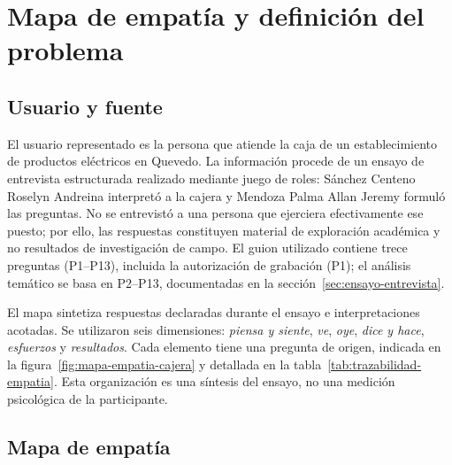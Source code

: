 \section{Mapa de empatía y definición del problema}
\label{sec:mapa-empatia}

\subsection{Usuario y fuente}

El usuario representado es la persona que atiende la caja de un establecimiento de productos eléctricos en Quevedo. La información procede de un ensayo de entrevista estructurada realizado mediante juego de roles: Sánchez Centeno Roselyn Andreina interpretó a la cajera y Mendoza Palma Allan Jeremy formuló las preguntas. No se entrevistó a una persona que ejerciera efectivamente ese puesto; por ello, las respuestas constituyen material de exploración académica y no resultados de investigación de campo. El guion utilizado contiene trece preguntas (P1--P13), incluida la autorización de grabación (P1); el análisis temático se basa en P2--P13, documentadas en la sección~\ref{sec:ensayo-entrevista}.

El mapa sintetiza respuestas declaradas durante el ensayo e interpretaciones acotadas. Se utilizaron seis dimensiones: \emph{piensa y siente}, \emph{ve}, \emph{oye}, \emph{dice y hace}, \emph{esfuerzos} y \emph{resultados}. Cada elemento tiene una pregunta de origen, indicada en la figura~\ref{fig:mapa-empatia-cajera} y detallada en la tabla~\ref{tab:trazabilidad-empatia}. Esta organización es una síntesis del ensayo, no una medición psicológica de la participante.

\subsection{Mapa de empatía}

